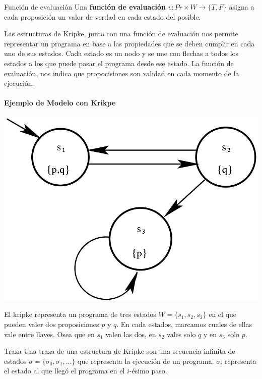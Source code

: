 \begin{definicion}{Función de evaluación}
Una \textbf{función de evaluación} $v:Pr\times W \to \{T,F\}$ asigna a cada proposición un valor de verdad en cada estado del posible.
\end{definicion}

Las estructuras de Kripke, junto con una función de evaluación nos permite representar un programa en base a las propiedades que se deben cumplir en cada uno de sus estados. Cada estado es un nodo y se une con flechas a todos los estados a los que puede pasar el programa desde ese estado. La función de evaluación, nos indica que propocisiones son validad en cada momento de la ejecución.

\paragraph{Ejemplo de Modelo con Krikpe}
\begin{center}
    \includegraphics[scale=0.3]{imagenes/kripke.png}
\end{center}

El kripke representa un programa de tres estados $W=\{s_1,s_2,s_3\}$ en el que pueden valer dos proposiciones $p$ y $q$. En cada estados, marcamos cuales de ellas vale entre llaves. Osea que en $s_1$ valen las dos, en $s_2$ vales solo $q$ y en $s_3$ solo $p$.

\begin{definicion}{Traza}
Una traza de una estructura de Kripke son una secuencia infinita de estados $\sigma = \{\sigma_0,\sigma_1,\dots\}$ que representa la ejecución de un programa. $\sigma_i$ representa el estado al que llegó el programa en el $i$-ésimo paso.
\end{definicion}

